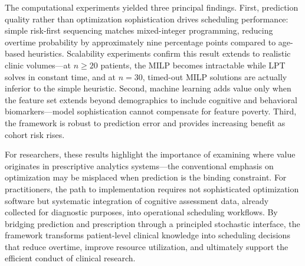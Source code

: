 \documentclass[11pt,a4paper]{article}
\begin{document}
The computational experiments yielded three principal findings. First, prediction quality rather than optimization sophistication drives scheduling performance: simple risk-first sequencing matches mixed-integer programming, reducing overtime probability by approximately nine percentage points compared to age-based heuristics. Scalability experiments confirm this result extends to realistic clinic volumes---at $n \geq 20$ patients, the MILP becomes intractable while LPT solves in constant time, and at $n = 30$, timed-out MILP solutions are actually inferior to the simple heuristic. Second, machine learning adds value only when the feature set extends beyond demographics to include cognitive and behavioral biomarkers---model sophistication cannot compensate for feature poverty. Third, the framework is robust to prediction error and provides increasing benefit as cohort risk rises.

For researchers, these results highlight the importance of examining where value originates in prescriptive analytics systems---the conventional emphasis on optimization may be misplaced when prediction is the binding constraint. For practitioners, the path to implementation requires not sophisticated optimization software but systematic integration of cognitive assessment data, already collected for diagnostic purposes, into operational scheduling workflows. By bridging prediction and prescription through a principled stochastic interface, the framework transforms patient-level clinical knowledge into scheduling decisions that reduce overtime, improve resource utilization, and ultimately support the efficient conduct of clinical research.



\end{document}
